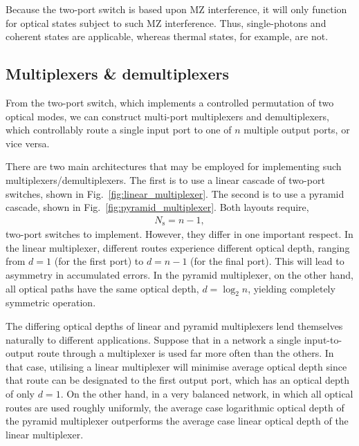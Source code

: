 Because the two-port switch is based upon MZ interference, it will only function for optical states subject to such MZ interference. Thus, single-photons and coherent states are applicable, whereas thermal states, for example, are not.

%
%

\subsection{Multiplexers \& demultiplexers} 

From the two-port switch, which implements a controlled permutation of two optical modes, we can construct multi-port multiplexers and demultiplexers, which controllably route a single input port to one of $n$ multiple output ports, or vice versa.

There are two main architectures that may be employed for implementing such multiplexers/demultiplexers. The first is to use a linear cascade of two-port switches, shown in Fig.~\ref{fig:linear_multiplexer}. The second is to use a pyramid cascade, shown in Fig.~\ref{fig:pyramid_multiplexer}. Both layouts require,
\begin{align}
N_\mathrm{s} = n-1,
\end{align}
two-port switches to implement. However, they differ in one important respect. In the linear multiplexer, different routes experience different optical depth, ranging from \mbox{$d=1$} (for the first port) to \mbox{$d=n-1$} (for the final port). This will lead to asymmetry in accumulated errors. In the pyramid multiplexer, on the other hand, all optical paths have the same optical depth, \mbox{$d=\log_2 n$}, yielding completely symmetric operation.

The differing optical depths of linear and pyramid multiplexers lend themselves naturally to different applications. Suppose that in a network a single input-to-output route through a multiplexer is used far more often than the others. In that case, utilising a linear multiplexer will minimise average optical depth since that route can be designated to the first output port, which has an optical depth of only \mbox{$d=1$}. On the other hand, in a very balanced network, in which all optical routes are used roughly uniformly, the average case logarithmic optical depth of the pyramid multiplexer outperforms the average case linear optical depth of the linear multiplexer.

